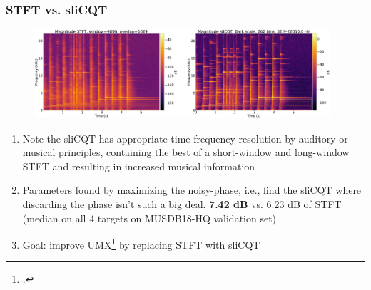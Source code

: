 \documentclass[usenames,dvipsnames]{beamer}
\begin{document}
\begin{frame}
	\frametitle{STFT vs. sliCQT}
	\begin{figure}[ht]
		\centering
		\includegraphics[height=3.3cm]{./images-mml-presentation/spectrograms_comparison.png}
		\vspace{-0.85em}
	\end{figure}
	\begin{enumerate}
		\item
			Note the sliCQT has appropriate time-frequency resolution by auditory or musical principles, containing the best of a short-window and long-window STFT and resulting in increased musical information
		\item
			Parameters found by maximizing the noisy-phase, i.e., find the sliCQT where discarding the phase isn't such a big deal. \textbf{7.42 dB} vs. 6.23 dB of STFT (median on all 4 targets on MUSDB18-HQ validation set)
		\item
			Goal: improve UMX\footcite{umx} by replacing STFT with sliCQT
	\end{enumerate}
\end{frame}
\end{document}
